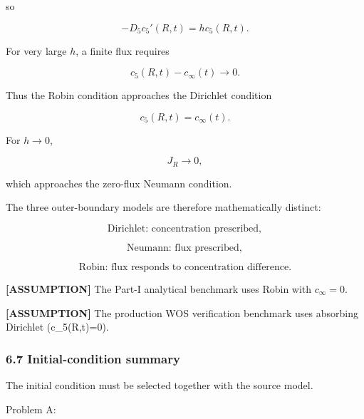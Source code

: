 \documentclass[11pt,a4paper]{article}
\begin{document}
so

\begin{equation}
-D_5c_5'(R,t)=hc_5(R,t).
\tag{TRISO-BC-122}
\label{eq:triso-bc-122}
\end{equation}

For very large $h$, a finite flux requires

\begin{equation}
c_5(R,t)-c_\infty(t)\to0.
\tag{TRISO-BC-123}
\label{eq:triso-bc-123}
\end{equation}

Thus the Robin condition approaches the Dirichlet condition

\begin{equation}
c_5(R,t)=c_\infty(t).
\tag{TRISO-BC-124}
\label{eq:triso-bc-124}
\end{equation}

For $h\to0$,

\begin{equation}
J_R\to0,
\tag{TRISO-BC-125}
\label{eq:triso-bc-125}
\end{equation}

which approaches the zero-flux Neumann condition.

The three outer-boundary models are therefore mathematically distinct:

\begin{equation}
\text{Dirichlet: concentration prescribed},
\end{equation}

\begin{equation}
\text{Neumann: flux prescribed},
\end{equation}

\begin{equation}
\text{Robin: flux responds to concentration difference}.
\end{equation}

\textbf{[ASSUMPTION]} The Part-I analytical benchmark uses Robin with $c_\infty=0$.

\textbf{[ASSUMPTION]} The production WOS verification benchmark uses absorbing Dirichlet (c\_5(R,t)=0).

\subsubsection*{6.7 Initial-condition summary}

The initial condition must be selected together with the source model.

Problem A:
\end{document}
